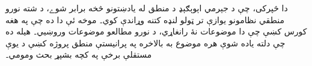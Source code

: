 \documentclass[../../../include/open-logic-chapter]{subfiles}
\begin{document}

\begin{editorial}
  دا څپرکى، چې د جېرمي اېوېګېډ د منطق له يادښتونو څخه برابر شوے، د
  شته نورو منطقي نظامونو يوازې تر ټولو لنډه کتنه وړاندې کوي۔ موخه ئې دا
  ده چې په هغه کورس کښې چې دا موضوعات نۀ رانغاړي، د نورو مطالعو موضوعات
  وروښيي۔ هيله ده چې دلته ياده شوې هره موضوع به بالاخره په پرانيستې
  منطق پروژه کښې د يوې مستقلې برخې په کچه بشپړ بحث ومومي۔
\end{editorial}








\OLEndChapterHook
\end{document}
